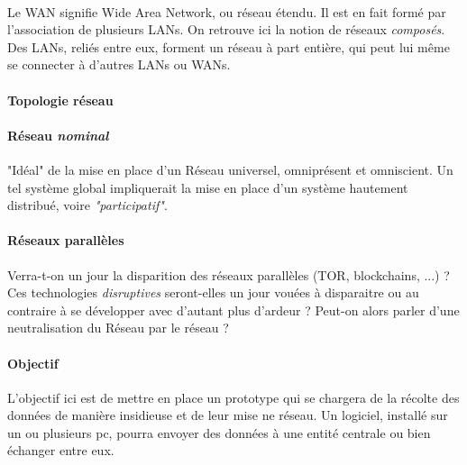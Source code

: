 \paragraph{} Le WAN signifie Wide Area Network, ou réseau étendu. Il est en fait formé par
l'association de plusieurs LANs. On retrouve ici la notion de réseaux \emph{composés}. Des LANs,
reliés entre eux, forment un réseau à part entière, qui peut lui même se connecter à d'autres
LANs ou WANs.

\paragraph{Topologie réseau}

\paragraph{}

\paragraph{Réseau \emph{nominal}} "Idéal" de la mise en place d'un Réseau universel, omniprésent
et omniscient. Un tel système global impliquerait la mise en place d'un système hautement
distribué, voire \emph{"participatif"}.

\paragraph{Réseaux parallèles} Verra-t-on un jour la disparition des réseaux parallèles
(TOR, blockchains, ...) ? Ces technologies \emph{disruptives} seront-elles un jour vouées
à disparaitre ou au contraire à se développer avec d'autant plus d'ardeur ? Peut-on alors
parler d'une neutralisation du Réseau par le réseau ?

\paragraph{Objectif} L'objectif ici est de mettre en place un prototype qui se chargera de la récolte des données
de manière insidieuse et de leur mise ne réseau. Un logiciel, installé sur un ou plusieurs pc,
pourra envoyer des données à une entité centrale ou bien échanger entre eux.
